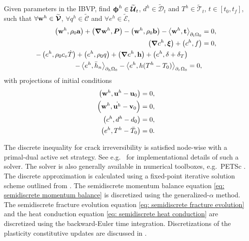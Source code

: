 \begin{mdframed}[
    frametitle={The semidiscrete Galerkin form},
    frametitlebackgroundcolor=gray!20,
    backgroundcolor=gray!5,
    linewidth=0pt,
    nobreak=true
  ]
  Given parameters in the IBVP, find $\boldsymbol{\upphi}^h \in \widetilde{\boldsymbol{\mathcal{U}}}_t$, $d^h \in \widetilde{\mathcal{D}}_t$ and $T^h \in \widetilde{\mathcal{T}}_t$, $t \in [t_0, t_f]$, such that $\forall \textbf{w}^h \in \widetilde{\boldsymbol{\mathcal{V}}}$, $\forall q^h \in \widetilde{\mathcal{C}}$ and $\forall e^h \in \widetilde{\mathcal{E}}$,
  \begin{subequations}
    \begin{align}
      \left( \textbf{w}^h, \rho_0\textbf{a} \right) + \left( \boldsymbol{\nabla} \textbf{w}^h, \boldsymbol{P} \right) - \left( \textbf{w}^h, \rho_0 \textbf{b} \right) - \left< \textbf{w}^h, \textbf{t} \right>_{\partial_t\Omega_0} & = 0, \label{eq: semidiscrete momentum balance}   \\
      \left( \boldsymbol{\nabla} c^h, \boldsymbol{\xi} \right) + \left( c^h, f \right)                                                                                                   & = 0, \label{eq: semidiscrete fracture evolution} \\
      \begin{split}
        - \left( e^h, \rho_0c_v\dot{T} \right) + \left( e^h, \rho_0q \right) + \left( \boldsymbol{\nabla} e^h, \textbf{h} \right) + \left( e^h, \delta+\delta_T \right)& \\
        - \left< e^h, \bar{h}_n \right>_{\partial_h\Omega_0} - \left< e^h, h(T^h-T_0) \right>_{\partial_r\Omega_0} &= 0,
      \end{split} \label{eq: semidiscrete heat conduction}
    \end{align}
  \end{subequations}
  with projections of initial conditions
  \begin{subequations}
    \begin{align}
      \left( \textbf{w}^h, \textbf{u}^h - \textbf{u}_0 \right)       & = 0, \\
      \left( \textbf{w}^h, \dot{\textbf{u}^h} - \textbf{v}_0 \right) & = 0, \\
      \left( c^h, d^h - d_0 \right)                & = 0, \\
      \left( e^h, T^h - \bar{T}_0 \right)          & = 0. 
    \end{align}
  \end{subequations}
\end{mdframed}
The discrete inequality for crack irreversibility is satisfied node-wise with a primal-dual active set strategy. See e.g.\  \citet{heister2015primal} for implementational details of such a solver. The solver is also generally available in numerical toolboxes, e.g.\  PETSc \cite{petsc-web-page}. The discrete approximation is calculated using a fixed-point iterative solution scheme outlined from \cite{HuGary2020}. The semidiscrete momentum balance equation \eqref{eq: semidiscrete momentum balance} is discretized using the generalized-$\alpha$ method. The semidiscrete fracture evolution equation \eqref{eq: semidiscrete fracture evolution} and the heat conduction equation \eqref{eq: semidiscrete heat conduction} are discretized using the backward-Euler time integration. Discretizations of the plasticity constitutive updates are discussed in .
